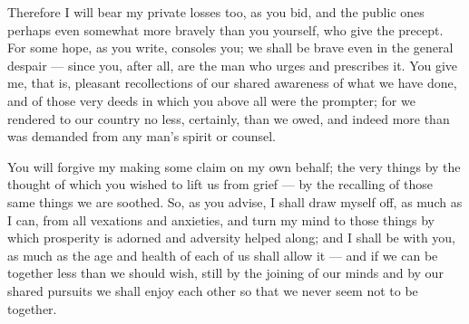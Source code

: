  Therefore I will bear my private losses too, as you bid, and the public ones perhaps even somewhat more bravely than you yourself, who give the precept. For some hope, as you write, consoles you; we shall be brave even in the general despair --- since you, after all, are the man who urges and prescribes it. You give me, that is, pleasant recollections of our shared awareness of what we have done, and of those very deeds in which you above all were the prompter; for we rendered to our country no less, certainly, than we owed, and indeed more than was demanded from any man's spirit or counsel.

 You will forgive my making some claim on my own behalf; the very things by the thought of which you wished to lift us from grief --- by the recalling of those same things we are soothed. So, as you advise, I shall draw myself off, as much as I can, from all vexations and anxieties, and turn my mind to those things by which prosperity is adorned and adversity helped along; and I shall be with you, as much as the age and health of each of us shall allow it --- and if we can be together less than we should wish, still by the joining of our minds and by our shared pursuits we shall enjoy each other so that we never seem not to be together.
